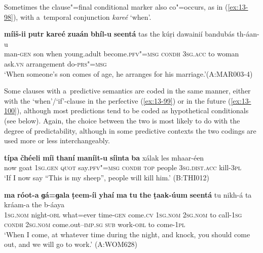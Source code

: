 Sometimes the clause"=final conditional marker also co"=occurs, as in (\ref{ex:13-98}), with a~temporal conjunction \textit{kareé} `when'. 

\begin{exe}
\ex
\label{ex:13-98}
\gll \textbf{míiš-ii} \textbf{putr} \textbf{kareé} \textbf{zuaán} \textbf{bhíl-u} \textbf{seentá} tas the kúṛi dawainií bandubás th-áan-u\\
man-\textsc{gen} son when young.adult become.\textsc{pfv"=msg} \textsc{condh} \textsc{3sg.acc} to woman ask.\textsc{vn} arrangement do-\textsc{prs"=msg}  \\
\glt `When someone's son comes of age, he arranges for his marriage.'\newline (A:MAR003-4) 
\end{exe}

Some clauses with a~predictive semantics are coded in the same manner, either with the `when'/`if'-clause in the perfective (\ref{ex:13-99}) or in the future (\ref{ex:13-100}), although most predictions tend to be coded as hypothetical conditionals (see below). Again, the choice between the two is most likely to do with the degree of predictability, although in some predictive contexts the two codings are used more or less interchangeably.

\begin{exe}
\ex
\label{ex:13-99}
\gll \textbf{típa} \textbf{čhéeli} \textbf{míi} \textbf{thaní} \textbf{maníit-u} \textbf{síinta} \textbf{ba}  xálak les mhaar-éen\\
now goat \textsc{1sg.gen} \textsc{quot} say.\textsc{pfv"=msg} \textsc{condh} \textsc{top} people \textsc{3sg.dist.acc} kill-\textsc{3pl}\\
\glt `If I now say ``This is my sheep'', people will kill him.' (B:THI012)

\ex
\label{ex:13-100}
\gll \textbf{ma} \textbf{róot-a} \textbf{ɡá=ɡala} \textbf{ṭeem-íi} \textbf{yhaí} \textbf{ma} \textbf{tu} \textbf{the} \textbf{ṭaak-úum} \textbf{seentá} tu nikh-á ta kráam-a the b-áaya\\
\textsc{1sg.nom} night-\textsc{obl} what=ever time-\textsc{gen} come.\textsc{cv} \textsc{1sg.nom} \textsc{2sg.nom} to call-\textsc{1sg} \textsc{condh} \textsc{2sg.nom} come.out--\textsc{imp.sg} \textsc{sub} work-\textsc{obl} to come-\textsc{1pl}\\
\glt `When I come, at whatever time during the night, and knock, you should come out, and we will go to work.' (A:WOM628) 
\end{exe}

